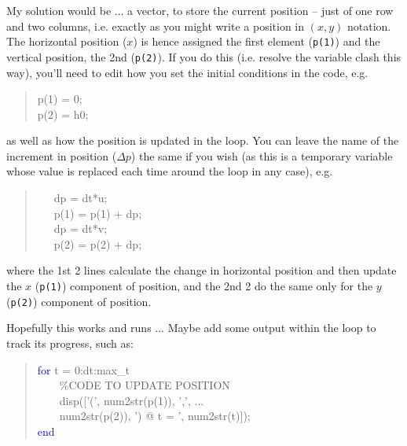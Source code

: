 \documentclass{tufte-book} %
\newenvironment{docspec}{\begin{quotation}\ttfamily\parskip0pt\parindent0pt\ignorespaces}{\end{quotation}}
\newenvironment{docspecmargin}{\begin{quotation}\ttfamily\footnotesize\parskip0pt\parindent0pt\ignorespaces}{\end{quotation}}
\begin{document}
My solution would be ... a vector, to store the current position -- just of one row and two columns, i.e. exactly as you might write a position in \((x,y)\) notation. The horizontal position (\(x\)) is hence assigned the first element (\texttt{p(1)}) and the vertical position, the 2nd (\texttt{p(2)}). If you do this (i.e. resolve the variable clash this way), you'll need to edit how you set the initial conditions in the code, e.g.
\begin{docspec}
p(1) = 0;
\\p(2) = h0;
\end{docspec}
as well as how the position is updated in the loop. You can leave the name of the increment in position (\(\Delta p\)) the same if you wish (as this is a temporary variable whose value is replaced each time around the loop in any case), e.g.
\begin{docspec}
\ \ \ dp = dt*u;\\
\ \ \ p(1) = p(1) + dp;\\
\ \ \ dp = dt*v;\\
\ \ \ p(2) = p(2) + dp;
\end{docspec}
where the 1st 2 lines calculate the change in horizontal position and then update the \(x\) (\texttt{p(1)}) component of position, and the 2nd 2 do the same only for the \(y\) (\texttt{p(2)}) component of position. 

Hopefully this works and runs ... Maybe add some output within the loop to track its progress, such as:
\begin{docspecmargin}
\textcolor{blue}{for} t = 0:dt:max\_t
\\ \ \ \ \ \textcolor[rgb]{0,0.501961,0}{\%CODE TO UPDATE POSITION}
\\ \ \ \ \ disp([\textcolor[rgb]{1,0,1}{'('}, num2str(p(1)), \textcolor[rgb]{1,0,1}{','}, ...
\\ \ \ \ \ num2str(p(2)), \textcolor[rgb]{1,0,1}{') @ t = '}, num2str(t)]);
\\\textcolor{blue}{end}
\end{docspecmargin}
\end{document}
